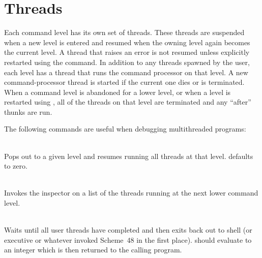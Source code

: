 \section{Threads}
\label{command-threads}

Each command level has its own set of threads.  These threads are suspended
 when a new level is entered and resumed when the owning level again becomes
 the current level.
A thread that raises an error is not resumed unless
 explicitly restarted using the  command.
In addition to any threads spawned by the user, each level has a thread
 that runs the command processor on that level.
A new command-processor thread is started if the current one
 dies or is terminated.
When a command level is abandoned for a lower level, or when
 a level is restarted using , all of the threads on that
 level are terminated and any  ``after'' thunks are run.

The following commands are useful when debugging multithreaded programs:
\begin{description}
\item {}\\
  Pops out to a given level and resumes running all threads at that level.
   defaults to zero.

\item {}\\
    Invokes the inspector on a list of the threads running at the
    next lower command level.

\item {}\\
    Waits until all user threads have completed and then
    exits back out to shell (or executive or whatever invoked Scheme~48
    in the first place).
     should evaluate to an integer which is then
    returned to the calling program.

%
%

\end{description}


